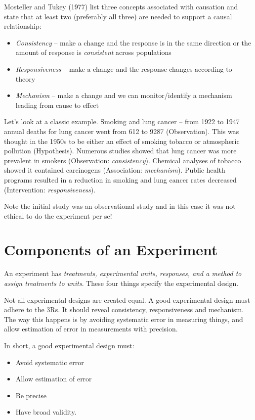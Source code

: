 \documentclass[
]{book}
\providecommand{\tightlist}{%
  \setlength{\itemsep}{0pt}\setlength{\parskip}{0pt}}
\begin{document}
Mosteller and Tukey (1977) list three concepts associated with causation and state that at least two (preferably all three) are needed to support a causal relationship:

\begin{itemize}
\tightlist
\item
  \emph{Consistency} -- make a change and the response is in the same direction or the amount of response is \emph{consistent} across populations
\item
  \emph{Responsiveness} -- make a change and the response changes according to theory
\item
  \emph{Mechanism} -- make a change and we can monitor/identify a mechanism leading from cause to effect
\end{itemize}

Let's look at a classic example. Smoking and lung cancer -- from 1922 to 1947 annual deaths for lung cancer went from 612 to 9287 (Observation). This was thought in the 1950s to be either an effect of smoking tobacco or atmospheric pollution (Hypothesis). Numerous studies showed that lung cancer was more prevalent in smokers (Observation: \emph{consistency}). Chemical analyses of tobacco showed it contained carcinogens (Association: \emph{mechanism}). Public health programs resulted in a reduction in smoking and lung cancer rates decreased (Intervention: \emph{responsiveness}).

Note the initial study was an observational study and in this case it was not ethical to do the experiment per se!

\hypertarget{components-of-an-experiment}{%
\section{Components of an Experiment}\label{components-of-an-experiment}}

An experiment has \emph{treatments, experimental units, responses, and a method to assign treatments to units}. These four things specify the experimental design.

Not all experimental designs are created equal. A good experimental design must adhere to the 3Rs. It should reveal consistency, responsiveness and mechanism. The way this happens is by avoiding systematic error in measuring things, and allow estimation of error in measurements with precision.

In short, a good experimental design must:

\begin{itemize}
\tightlist
\item
  Avoid systematic error
\item
  Allow estimation of error
\item
  Be precise
\item
  Have broad validity.
\end{itemize}
\end{document}
